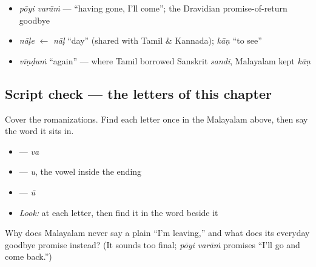 \begin{cousinweb}
\begin{itemize}
\raggedright
  \item \emph{pōyi varāṁ} — \textquotedblleft{}having gone, I'll come\textquotedblright{}; the Dravidian promise-of-return goodbye
  \item \emph{nāḷe} $\leftarrow$ \emph{nāḷ} \textquotedblleft{}day\textquotedblright{} (shared with Tamil \& Kannada); \emph{kāṇ} \textquotedblleft{}to see\textquotedblright{}
  \item \emph{vīṇḍuṁ} \textquotedblleft{}again\textquotedblright{} — where Tamil borrowed Sanskrit \emph{sandi}, Malayalam kept \emph{kāṇ}
\end{itemize}
\end{cousinweb}

\subsection*{Script check — the letters of this chapter}
Cover the romanizations. Find each letter once in the Malayalam above, then say the word it sits in.

\begin{itemize}
\raggedright
  \item \textbf{} — \textbf{} \emph{va}
  \item \textbf{} — \textbf{} \emph{u}, the vowel inside the ending \textbf{}
  \item \textbf{} — \textbf{} \emph{ū}
\end{itemize}

\begin{itemize}
\raggedright
  \item \emph{Look:} at each letter, then find it in the word beside it
\end{itemize}

\begin{tcolorbox}[breakable,colback=teal!4,colframe=teal!35!black,title={Before you move on}]
Why does Malayalam never say a plain \textquotedblleft{}I'm leaving,\textquotedblright{} and what does its everyday goodbye promise instead? (It sounds too final; \emph{pōyi varāṁ} promises \textquotedblleft{}I'll go and come back.\textquotedblright{})
\end{tcolorbox}
